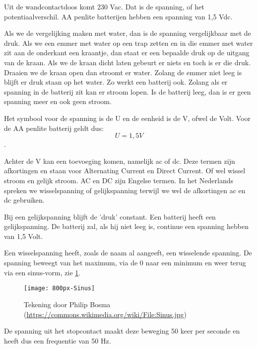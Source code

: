 Uit de wandcontactdoos komt 230 Vac. Dat is de spanning, of het potentiaalverschil. AA penlite batterijen hebben een spanning van 1,5 Vdc.

Als we de vergelijking maken met water, dan is de spanning vergelijkbaar met de druk. Als we een emmer met water op een trap zetten en in die emmer met water zit aan de onderkant een kraantje, dan staat er een bepaalde druk op de uitgang van de kraan. Als we de kraan dicht laten gebeurt er niets en toch is er die druk. Draaien we de kraan open dan stroomt er water. Zolang de emmer niet leeg is blijft er druk staan op het water. Zo werkt een batterij ook. Zolang als er spanning in de batterij zit kan er stroom lopen. Is de batterij leeg, dan is er geen spanning meer en ook geen stroom.

Het symbool voor de spanning is de U en de eenheid is de V, ofwel de Volt. Voor de AA penlite batterij geldt dus: \[ U = 1,5 V \].

Achter de V kan een toevoeging komen, namelijk ac of dc. Deze termen zijn afkortingen en staan voor Alternating Current en Direct Current. Of wel wissel stroom en gelijk stroom. AC en DC zijn Engelse termen. In het Nederlands spreken we wisselspanning of gelijkspanning terwijl we wel de afkortingen ac en dc gebruiken.

Bij een gelijkspanning blijft de 'druk' constant. Een batterij heeft een gelijkspanning. De batterij zal, als hij niet leeg is, continue een spanning hebben van 1,5 Volt.

Een wisselspanning heeft, zoals de naam al aangeeft, een wisselende spanning. De spanning beweegt van het maximum, via de 0 naar een minimum en weer terug via een sinus-vorm, zie \ref{fig:sinus}.

\begin{figure}[h]
\texttt{[image: 800px-Sinus]}
\centering
\caption{Tekening door Philip Bosma (\url{https://commons.wikimedia.org/wiki/File:Sinus.jpg})}
\label{fig:sinus}
\end{figure}

De spanning uit het stopcontact maakt deze beweging 50 keer per seconde en heeft dus een frequentie van 50 Hz.

